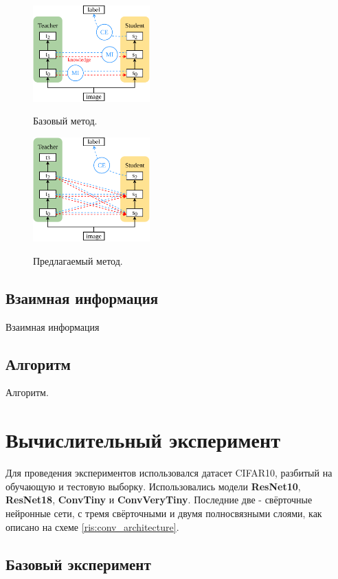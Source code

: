 \documentclass[14]{article}
\begin{document}
\begin{figure}[h]
  \begin{multicols}{2}
    \hfill
    \includegraphics[width=0.4\textwidth]{../figures/ahn_diagram.pdf}
    \hfill
    \caption{Базовый метод.}
    \label{ris:ahn_diagram}
    \hfill
    \includegraphics[width=0.4\textwidth]{../figures/our_diagram.pdf}
    \hfill
    \caption{Предлагаемый метод.}
    \label{ris:our_diagram}
  \end{multicols}
\end{figure}

\subsection{Взаимная информация}
Взаимная информация

\subsection{Алгоритм}
Алгоритм.
\section{Вычислительный эксперимент}

Для проведения экспериментов использовался датасет CIFAR10, разбитый на обучающую и тестовую выборку.
Использовались модели \textbf{ResNet10}, \textbf{ResNet18}, \textbf{ConvTiny} и \textbf{ConvVeryTiny}.
Последние две - свёрточные нейронные сети, с тремя свёрточными и двумя полносвязными слоями, как описано на схеме \ref{ris:conv_architecture}.


\subsection{Базовый эксперимент}
\end{document}
